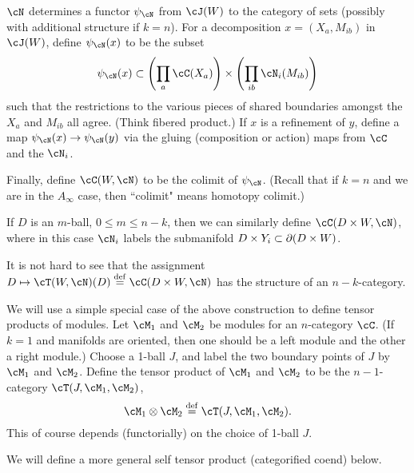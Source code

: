 $\cN$ determines 
a functor $\psi_\cN$ from $\cJ(W)$ to the category of sets 
(possibly with additional structure if $k=n$).
For a decomposition $x = (X_a, M_{ib})$ in $\cJ(W)$, define $\psi_\cN(x)$ to be the subset
\[
	\psi_\cN(x) \sub \left(\prod_a \cC(X_a)\right) \times \left(\prod_{ib} \cN_i(M_{ib})\right)
\]
such that the restrictions to the various pieces of shared boundaries amongst the
$X_a$ and $M_{ib}$ all agree.
(Think fibered product.)
If $x$ is a refinement of $y$, define a map $\psi_\cN(x)\to\psi_\cN(y)$
via the gluing (composition or action) maps from $\cC$ and the $\cN_i$.

Finally, define $\cC(W, \cN)$ to be the colimit of $\psi_\cN$.
(Recall that if $k=n$ and we are in the $A_\infty$ case, then ``colimit" means
homotopy colimit.)

If $D$ is an $m$-ball, $0\le m \le n-k$, then we can similarly define
$\cC(D\times W, \cN)$, where in this case $\cN_i$ labels the submanifold 
$D\times Y_i \subset \partial(D\times W)$.

It is not hard to see that the assignment $D \mapsto \cT(W, \cN)(D) \deq \cC(D\times W, \cN)$
has the structure of an $n{-}k$-category.

\medskip



We will use a simple special case of the above 
construction to define tensor products 
of modules.
Let $\cM_1$ and $\cM_2$ be modules for an $n$-category $\cC$.
(If $k=1$ and manifolds are oriented, then one should be 
a left module and the other a right module.)
Choose a 1-ball $J$, and label the two boundary points of $J$ by $\cM_1$ and $\cM_2$.
Define the tensor product of $\cM_1$ and $\cM_2$ to be the 
$n{-}1$-category $\cT(J, \cM_1, \cM_2)$,
\[
	\cM_1\otimes \cM_2 \deq \cT(J, \cM_1, \cM_2) .
\]
This of course depends (functorially)
on the choice of 1-ball $J$.

We will define a more general self tensor product (categorified coend) below.









